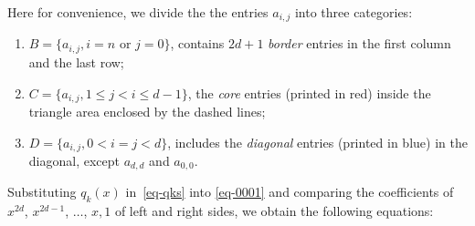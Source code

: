\documentclass[runningheads]{llncs}
\begin{document}
\noindent Here for convenience, we 
divide the 
the entries $a_{i,j}$ into three categories:
\begin{enumerate}
    \item $B=\{a_{i,j}, i=n \text{ or } j=0\}$, contains $2d+1$ {\it border\/} entries in the first column and the last row;  
    \item $C=\{a_{i,j}, 1\leq j<i\leq d-1\}$, 
    the {\it core\/} entries (printed in red) inside the triangle area enclosed by the dashed lines;
    \item $D=\{a_{i,j}, 0<i=j<d\}$, includes the {\it diagonal\/} entries (printed in blue) in the diagonal, except $a_{d,d}$ and $a_{0,0}$. 
\end{enumerate}

Substituting $q_k(x)$ in~\eqref{eq-qks} into \eqref{eq-0001} and comparing the coefficients of $x^{2d}$, $x^{2d-1}$, $\ldots$, $x,1$ of left and right sides, 
we obtain the following equations: 
\end{document}

